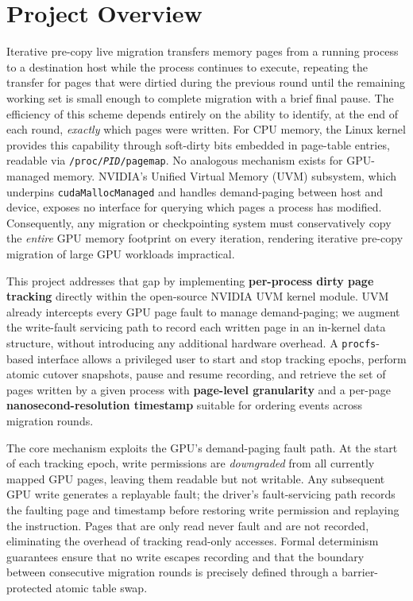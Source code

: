 \section*{Project Overview}

Iterative pre-copy live migration transfers memory pages from a running process
to a destination host while the process continues to execute, repeating the
transfer for pages that were dirtied during the previous round until the
remaining working set is small enough to complete migration with a brief final
pause.
The efficiency of this scheme depends entirely on the ability to identify,
at the end of each round, \emph{exactly} which pages were written.
For CPU memory, the Linux kernel provides this capability through soft-dirty
bits embedded in page-table entries, readable via \texttt{/proc/\textit{PID}/pagemap}.
No analogous mechanism exists for GPU-managed memory.
NVIDIA's Unified Virtual Memory (UVM) subsystem, which underpins \texttt{cudaMallocManaged}
and handles demand-paging between host and device, exposes no interface for
querying which pages a process has modified. Consequently, any migration or
checkpointing system must conservatively copy the \emph{entire} GPU memory
footprint on every iteration, rendering iterative pre-copy migration of
large GPU workloads impractical.

This project addresses that gap by implementing \textbf{per-process dirty page
tracking} directly within the open-source NVIDIA UVM kernel module.
UVM already intercepts every GPU page fault to manage demand-paging; we augment
the write-fault servicing path to record each written page in an in-kernel
data structure, without introducing any additional hardware overhead.
A \texttt{procfs}-based interface allows a privileged user to
start and stop tracking epochs, perform atomic cutover snapshots, pause and
resume recording, and retrieve the set of pages written by a given process
with \textbf{page-level granularity} and a per-page
\textbf{nanosecond-resolution timestamp} suitable for ordering events across
migration rounds.

The core mechanism exploits the GPU's demand-paging fault path.
At the start of each tracking epoch, write permissions are \emph{downgraded}
from all currently mapped GPU pages, leaving them readable but not writable.
Any subsequent GPU write generates a replayable fault; the driver's
fault-servicing path records the faulting page and timestamp before restoring
write permission and replaying the instruction.
Pages that are only read never fault and are not recorded, eliminating the
overhead of tracking read-only accesses.
Formal determinism guarantees ensure that no write escapes recording and that
the boundary between consecutive migration rounds is precisely defined through
a barrier-protected atomic table swap.

